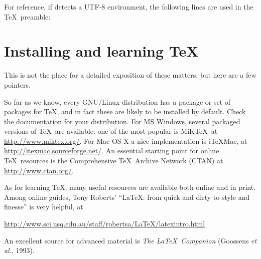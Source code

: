 For reference, if  detects a UTF-8 environment, the
following lines are used in the \TeX\ preamble:
%
\begin{code}
\usepackage{ucs}
\usepackage[utf8x]{inputenc}
\end{code}


\section{Installing and learning \TeX}
\label{tex-install}

This is not the place for a detailed exposition of these matters, but
here are a few pointers.  

So far as we know, every GNU/Linux distribution has a package or set
of packages for \TeX, and in fact these are likely to be installed by
default.  Check the documentation for your distribution.  For MS
Windows, several packaged versions of \TeX\ are available: one of the
most popular is MiK\TeX\, at \url{http://www.miktex.org/}.  For Mac OS
X a nice implementation is i\TeX{}Mac, at
\url{http://itexmac.sourceforge.net/}.  An essential starting point for
online \TeX\ resources is the Comprehensive
\TeX\ Archive Network (CTAN) at \url{http://www.ctan.org/}.

As for learning \TeX, many useful resources are available both online
and in print.  Among online guides, Tony Roberts' ``\LaTeX: from quick
and dirty to style and finesse'' is very helpful, at

\url{http://www.sci.usq.edu.au/staff/robertsa/LaTeX/latexintro.html}

An excellent source for advanced material is \emph{The \LaTeX\
  Companion} (Goossens \textit{et al.}, 1993).


